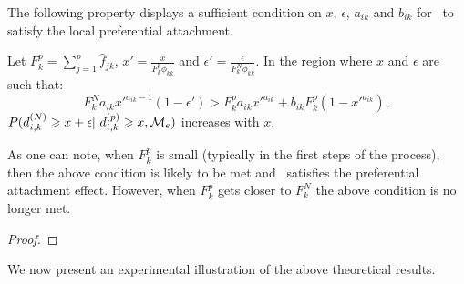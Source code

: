The following property displays a sufficient condition on $x$, $\epsilon$, $a_{ik}$ and $b_{ik}$ for \imb\ to satisfy the local preferential attachment.

\begin{proposition}\label{prop:IMBlocal}
Let $F_k^p = \sum_{j=1}^p \hat{f}_{jk}$, $x'=\frac{x}{F_k^p \phi_{kk}}$ and $\epsilon'=\frac{\epsilon}{F_k^N \phi_{kk}}$. In the region where $x$ and $\epsilon$ are such that:
%
\[
F_k^N a_{ik} x'^{a_{ik}-1} (1-\epsilon') > F_k^p a_{ik} x'^{a_{ik}} + b_{ik} F_k^p (1-x'^{a_{ik}}),
\]
%
$P(d_{i,k}^{(N)} \geq x+\epsilon | d_{i,k}^{(p)} \geq x,\M_e)$ increases with $x$.
\end{proposition}

As one can note, when $F_k^p$ is small (typically in the first steps of the process), then the above condition is likely to be met and \imb\ satisfies the preferential attachment effect. However, when $F_k^p$ gets closer to $F_k^N$ the above condition is no longer met.

\begin{proof}

\end{proof}


We now present an experimental illustration of the above theoretical results.



